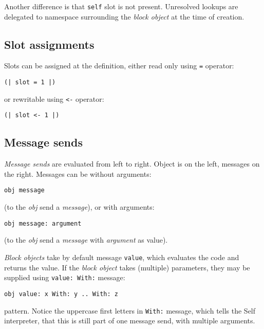 \documentclass[10pt]{article}
\begin{document}
\begin{multicols*}{3}
Another difference is that \texttt{self} slot is not present. Unresolved lookups are delegated to namespace surrounding the \textit{block object} at the time of creation.


\subsection{Slot assignments}
Slots can be assigned at the definition, either read only using \texttt{=} operator:

\begin{lstlisting}
(| slot = 1 |)
\end{lstlisting}

or rewritable using \texttt{<-} operator: %

\begin{lstlisting}
(| slot <- 1 |)
\end{lstlisting}

\subsection{Message sends}

\textit{Message sends} are evaluated from left to right. Object is on the left, messages on the right. Messages can be without arguments:

\begin{lstlisting}
obj message
\end{lstlisting}

(to the \textit{obj} send a \textit{message}), or with arguments:

\begin{lstlisting}
obj message: argument
\end{lstlisting}

(to the \textit{obj} send a \textit{message} with \textit{argument} as value).

\textit{Block objects} take by default message \texttt{value}, which evaluates the code and returns the value. If the \textit{block object} takes (multiple) parameters, they may be supplied using \texttt{value:\ With:} message:

\begin{lstlisting}
obj value: x With: y .. With: z
\end{lstlisting}

pattern. Notice the uppercase first letters in \texttt{With:} message, which tells the Self interpreter, that this is still part of one message send, with multiple arguments.


\end{multicols*}
\end{document}
